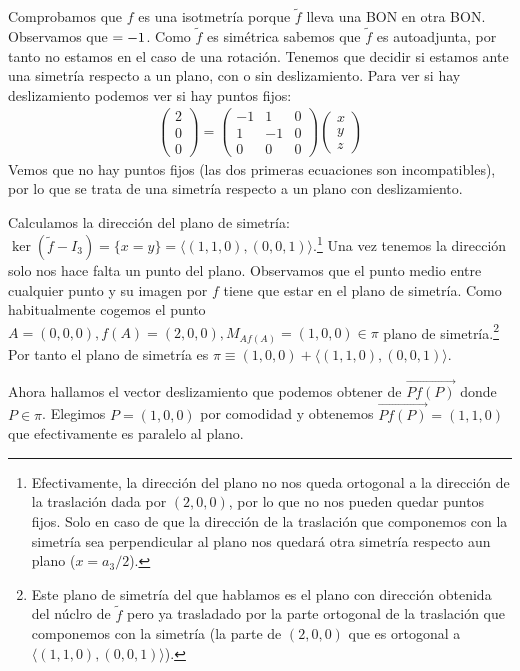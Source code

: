 \documentclass[14pt]{book}
\begin{document}
\begin{ej}
	Comprobamos que $f$ es una isotmetría porque $\tilde{f}$ lleva una BON en otra BON. Observamos que $\def \tilde{f} = -1$. Como $\tilde{f}$ es simétrica sabemos que $\tilde{f}$ es autoadjunta, por tanto no estamos en el caso de una rotación. Tenemos que decidir si estamos ante una simetría respecto a un plano, con o sin deslizamiento. Para ver si hay deslizamiento podemos ver si hay puntos fijos:
	\begin{align*}
		\left(\begin{array}{c}
		2 \\ 0 \\ 0
		\end{array}\right)  =
		\left(\begin{array}{ccc}
		-1 & 1 & 0 \\
		1 & -1 & 0 \\
		0 & 0 & 0
		\end{array}\right)\left(\begin{array}{c}
		x \\ y \\ z
		\end{array}\right)
	\end{align*}
	Vemos que no hay puntos fijos (las dos primeras ecuaciones son incompatibles), por lo que se trata de una simetría respecto a un plano con deslizamiento.
	
	Calculamos la dirección del plano de simetría: $\ker (\tilde{f} - I_3) = \{ x = y\} = \langle (1,1,0), (0,0,1) \rangle$.\footnote{Efectivamente, la dirección del plano no nos queda ortogonal a la dirección de la traslación dada por $(2,0,0)$, por lo que no nos pueden quedar puntos fijos. Solo en caso de que la dirección de la traslación que componemos con la simetría sea perpendicular al plano nos quedará otra simetría respecto aun plano ($x = a_3 /2$).} Una vez tenemos la dirección solo nos hace falta un punto del plano. Observamos que el punto medio entre cualquier punto y su imagen por $f$ tiene que estar en el plano de simetría. Como habitualmente cogemos el punto $A = (0,0,0), f(A) = (2,0,0), M_{A f(A)} = (1,0,0) \in \pi$ plano de simetría.\footnote{Este plano de simetría del que hablamos es el plano con dirección obtenida del núclro de $\tilde{f}$ pero ya trasladado por la parte ortogonal de la traslación que componemos con la simetría (la parte de $(2,0,0)$ que es ortogonal a $\langle (1,1,0), (0,0,1)\rangle$).} Por tanto el plano de simetría es $\pi \equiv (1,0,0) + \langle (1,1,0), (0,0,1)\rangle$.
	
	Ahora hallamos el vector deslizamiento que podemos obtener de $\overrightarrow{P f(P)}$ donde $P \in \pi$. Elegimos $P = (1,0,0)$ por comodidad y obtenemos $\overrightarrow{P f(P)} = (1,1,0)$ que efectivamente es paralelo al plano.
	

\end{ej}
\end{document}
